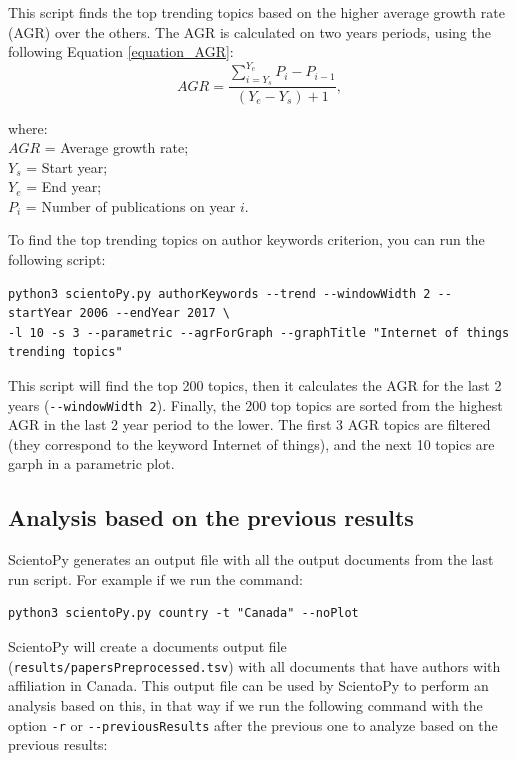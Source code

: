 \documentclass[10pt,letterpaper]{article}
\begin{document}
This script finds the top trending topics based on the higher average growth rate (AGR) over the others. The AGR is calculated on two years periods, using the following Equation \eqref{equation_AGR}:
\begin{equation*}
AGR = \frac{\sum\limits_{i = Y_s}^{Y_e}P_i - P_{i-1}}{(Y_e - Y_s)+1},  
\label{equation_AGR}
\end{equation*}

\setlength{\leftskip}{5cm}
\hspace*{-1cm}where:\\
$AGR$ = Average growth rate;\\
$Y_s$ = Start year;\\
$Y_e$ = End year;\\
$P_i$ = Number of publications on year $i.$\\

\setlength{\leftskip}{0pt}

To find the top trending topics on author keywords criterion, you can run the following script: 

\begin{verbatim}
python3 scientoPy.py authorKeywords --trend --windowWidth 2 --startYear 2006 --endYear 2017 \
-l 10 -s 3 --parametric --agrForGraph --graphTitle "Internet of things trending topics"
\end{verbatim}

This script will find the top 200 topics, then it calculates the AGR for the last 2 years (\verb|--windowWidth 2|). Finally, the 200 top topics are sorted from the highest AGR in the last 2 year period to the lower. The first 3 AGR topics are filtered (they correspond to the keyword Internet of things), and the next 10 topics are garph in a parametric plot. 

\subsection{Analysis based on the previous results}

ScientoPy generates an output file with all the output documents from the last run script. For example if we run the command:

\begin{verbatim}
python3 scientoPy.py country -t "Canada" --noPlot
\end{verbatim}

ScientoPy will create a documents output file (\verb|results/papersPreprocessed.tsv|) with all documents that have authors with affiliation in Canada. This output file can be used by ScientoPy to perform an analysis based on this, in that way if we run the following command with the option  \verb|-r| or \verb|--previousResults| after the previous one to analyze based on the previous results:
\end{document}
